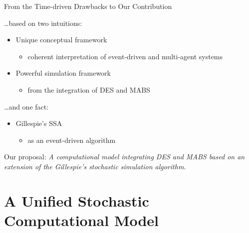 \documentclass[presentation]{beamer} %
\begin{document}
\begin{frame}{From the Time-driven Drawbacks to Our Contribution}

\ldots based on two intuitions:

\begin{itemize}
      \item  Unique conceptual framework \cite{omicini2015}
       \begin{itemize}
 	     	\item  coherent interpretation of event-driven and multi-agent systems 
	\end{itemize}
 	\item Powerful simulation framework \cite{meyer-mabs2014}
	\begin{itemize}
      		\item from the integration of DES and MABS 
	\end{itemize}
\end{itemize}

\ldots and one fact:
 
 \begin{itemize}
      \item  Gillespie's SSA  \cite{gillespie1977}
       \begin{itemize}
  		\item as an event-driven algorithm
	\end{itemize}
\end{itemize}

\begin{block}{Our proposal:}
\emph{A computational model integrating DES and MABS based on an extension of the Gillespie's stochastic simulation algorithm.}
  \end{block}
  
\end{frame}

\section{A Unified Stochastic Computational Model}
\end{document}
